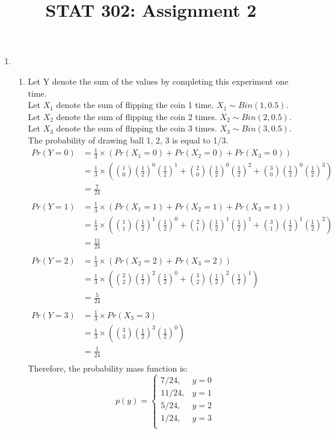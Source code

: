 \documentclass[11pt]{article}
\title{STAT 302: Assignment 2}
\begin{document}
\maketitle

\begin{enumerate}[label=\textbf{Question \arabic*:},start=1]

\item 
\begin{enumerate}
\item Let Y denote the sum of the values by completing this experiment one time.\\
Let \(X_1\) denote the sum of flipping the coin 1 time. \( X_1 \sim Bin(1, 0.5).\) \\
Let \(X_2\) denote the sum of flipping the coin 2 times. \( X_2 \sim Bin(2, 0.5).\) \\
Let \(X_3\) denote the sum of flipping the coin 3 times. \( X_3 \sim Bin(3, 0.5).\) \\
The probability of drawing ball 1, 2, 3 is equal to 1/3.\\
\begin{equation}
\begin{split}
Pr(Y=0) & = \frac{1}{3} \times (Pr(X_1 = 0) + Pr(X_2 = 0) + Pr(X_3 = 0)) \\
& = \frac{1}{3} \times ({1 \choose 0}(\frac{1}{2})^0(\frac{1}{2})^1 + {2 \choose 0}(\frac{1}{2})^0(\frac{1}{2})^2 + {3 \choose 0}(\frac{1}{2})^0(\frac{1}{2})^3) \\
& = \frac{7}{24} \\
\\
Pr(Y=1) & = \frac{1}{3} \times (Pr(X_1 = 1) + Pr(X_2 = 1) + Pr(X_3 = 1)) \\
& = \frac{1}{3} \times ({1 \choose 1}(\frac{1}{2})^1(\frac{1}{2})^0 + {2 \choose 1}(\frac{1}{2})^1(\frac{1}{2})^1 + {3 \choose 1}(\frac{1}{2})^1(\frac{1}{2})^2) \\
& = \frac{11}{24} \\
\\
Pr(Y=2) & = \frac{1}{3} \times (Pr(X_2 = 2) + Pr(X_3 = 2)) \\
& = \frac{1}{3} \times ({2 \choose 2}(\frac{1}{2})^2(\frac{1}{2})^0 + {3 \choose 2}(\frac{1}{2})^2(\frac{1}{2})^1) \\
& = \frac{5}{24} \\
\\
Pr(Y=3) & = \frac{1}{3} \times Pr(X_3 = 3) \\
& = \frac{1}{3} \times ({3 \choose 3}(\frac{1}{2})^3(\frac{1}{2})^0) \\
& = \frac{1}{24} \\
\end{split}
\end{equation}
Therefore, the probability mass function is:
  \[
    p(y) = \begin{cases}
        7/24, & y = 0\\
        11/24, & y = 1\\
        5/24, & y = 2\\
        1/24 , & y = 3\\
        \end{cases}
  \]


\end{enumerate}
\end{enumerate}
\end{document}
